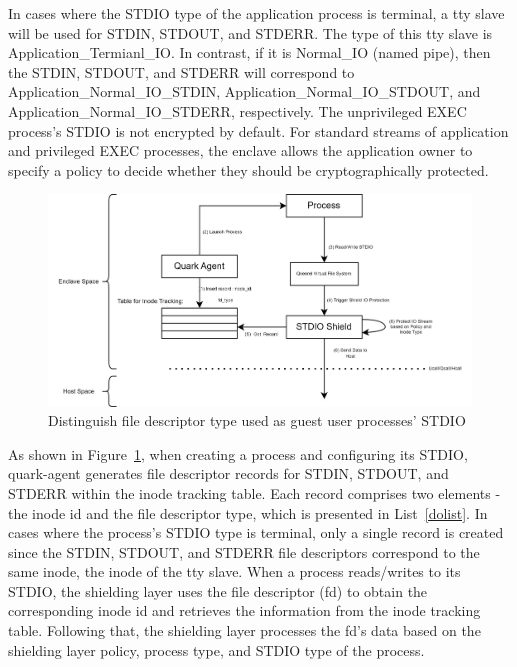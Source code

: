 In cases where the STDIO type of the application process is terminal, a tty slave will be used for STDIN, STDOUT, and STDERR. The type of this tty slave is Application\_Termianl\_IO.  In contrast, if it is Normal\_IO (named pipe), then the STDIN, 
STDOUT, and STDERR will correspond to Application\_Normal\_IO\_STDIN, Application\_Normal\_IO\_STDOUT, and Application\_Normal\_IO\_STDERR, respectively. The unprivileged EXEC process's STDIO is not encrypted by default. For standard streams of 
application and privileged EXEC processes, the enclave allows the application owner to specify a policy to decide whether they should be cryptographically protected.
\begin{figure}[htp]
    \centering
    \includegraphics[scale=0.5]{images/differenciate_fds.png}
    \caption[Distinguish file descriptor type used as guest user processes' STDIO]{Distinguish file descriptor type used as guest user processes' STDIO}
    \label{fig:differenciate_fds}
\end{figure}

As shown in Figure~\ref{fig:differenciate_fds}, when creating a process and configuring its STDIO, quark-agent generates file descriptor records for STDIN, STDOUT, and  STDERR within the inode tracking table. Each record comprises two elements - the inode id and the file descriptor type, which 
is presented in List~\ref{dolist}. In cases where the process's STDIO type is terminal, only a single record is created since the STDIN, STDOUT, and STDERR file descriptors correspond to the same inode, the inode of the tty slave. When a process 
reads/writes to its STDIO, the shielding layer uses the file descriptor (fd) to obtain the corresponding inode id and retrieves the information from the inode tracking table. Following that, the shielding layer processes the fd’s data based on the 
shielding layer policy, process type, and STDIO type of the process.
  
